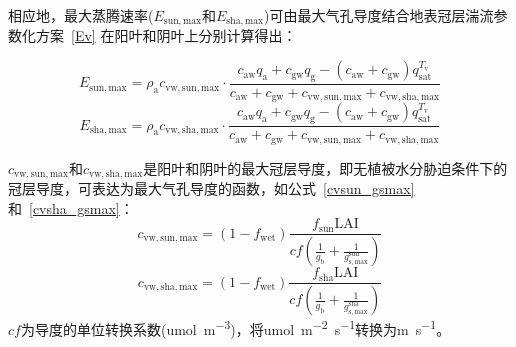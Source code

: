 相应地，最大蒸腾速率($E_{\mathrm{sun,max}}$和$E_{\mathrm{sha,max}}$)可由最大气孔导度结合地表冠层湍流参数化方案~\eqref{Ev} 在阳叶和阴叶上分别计算得出：

\begin{equation}\label{E_sunmax}
  E_{\mathrm{sun,max}}=\rho_{\mathrm{a}} c_{\mathrm{vw,sun,max}} \cdot \frac{c_{\mathrm{aw}} q_{\mathrm{a}}+c_{\mathrm{gw}} q_{\mathrm{g}}-
  \left(c_{\mathrm{aw}}+c_{\mathrm{gw}}\right) q_{\mathrm{s a t}}^{T_{\mathrm{v}}}}{c_{\mathrm{aw}}+c_{\mathrm{gw}}+c_{\mathrm{vw,sun,max}}+c_{\mathrm{vw,sha,max}}}
\end{equation}
%
\begin{equation}\label{Eshamax}
  E_{\mathrm{sha,max}}=\rho_{\mathrm{a}} c_{\mathrm{vw,sha,max}} \cdot \frac{c_{\mathrm{aw}} q_{\mathrm{a}}+c_{\mathrm{gw}} q_{\mathrm{g}}-
  \left(c_{\mathrm{aw}}+c_{\mathrm{gw}}\right) q_{\mathrm{s a t}}^{T_{\mathrm{v}}}}{c_{\mathrm{aw}}+c_{\mathrm{gw}}+c_{\mathrm{vw,sun,max}}+c_{\mathrm{vw,sha,max}}}
\end{equation}


$c_{\mathrm{vw,sun,max}}$和$c_{\mathrm{vw,sha,max}}$是阳叶和阴叶的最大冠层导度，即无植被水分胁迫条件下的冠层导度，可表达为最大气孔导度的函数，如公式~\eqref{cvsun_gsmax} 和~\eqref{cvsha_gsmax}：
\begin{equation}\label{cvsun_gsmax}
  c_{\mathrm{vw,sun,max}}=\left(1-f_{\mathrm{wet}}\right)\frac{f_{\mathrm{sun}}\text{LAI}}{cf\left(\frac{1}{g_{\mathrm {b}}}+\frac{1}{g_{\mathrm{s,max}}^{\mathrm {sun}}}\right)}
\end{equation}
%
\begin{equation}\label{cvsha_gsmax}
  c_{\mathrm{vw,sha,max}}=\left(1-f_{\mathrm{wet}}\right)\frac{f_{\mathrm{sha}}\text{LAI}}{cf\left(\frac{1}{g_{\mathrm {b}}}+\frac{1}{g_{\mathrm{s,max}}^{\mathrm {sha}}}\right)}
\end{equation}
$cf$为导度的单位转换系数(\unit{umol.m^{-3}})，将\unit{umol.m^{-2}.s^{-1}}转换为\unit{m.s^{-1}}。

